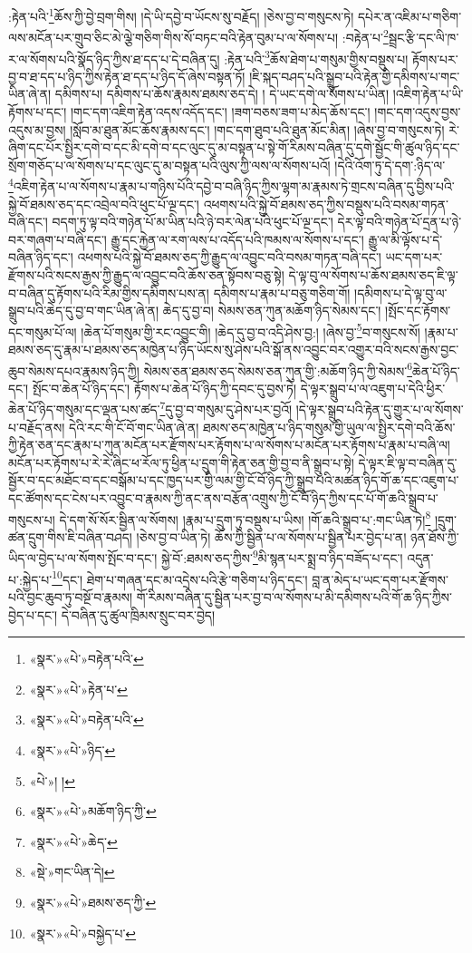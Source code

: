 :རྟེན་པའི་\footnote{«སྣར་»«པེ་»བརྟེན་པའི་}ཆོས་ཀྱི་བྱེ་བྲག་གིས། །དེ་ཡི་དབྱེ་བ་ཡོངས་སུ་བརྗོད། །ཅེས་བྱ་བ་གསུངས་ཏེ། དཔེར་ན་འཇིམ་པ་གཅིག་ལས་མངོན་པར་གྲུབ་ཅིང་མེ་ལྕེ་གཅིག་གིས་སོ་བཏང་བའི་རྟེན་བུམ་པ་ལ་སོགས་པ། :བརྟེན་པ་\footnote{«སྣར་»«པེ་»རྟེན་པ་}སྦྲང་རྩི་དང་ལི་ཁ་ར་ལ་སོགས་པའི་སྣོད་ཉིད་ཀྱིས་ཐ་དད་པ་དེ་བཞིན་དུ། :རྟེན་པའི་\footnote{«སྣར་»«པེ་»བརྟེན་པའི་}ཆོས་ཐེག་པ་གསུམ་གྱིས་བསྡུས་པ། རྟོགས་པར་བྱ་བ་ཐ་དད་པ་ཉིད་ཀྱིས་རྟེན་ཐ་དད་པ་ཉིད་དོ་ཞེས་བསྟན་ཏོ། །ཇི་སྐད་བཤད་པའི་སྒྲུབ་པའི་རྟེན་གྱི་དམིགས་པ་གང་ཡིན་ཞེ་ན། དམིགས་པ། དམིགས་པ་ཆོས་རྣམས་ཐམས་ཅད་དེ། །
དེ་ཡང་དགེ་ལ་སོགས་པ་ཡིན། །འཇིག་རྟེན་པ་ཡི་རྟོགས་པ་དང་། །གང་དག་འཇིག་རྟེན་འདས་འདོད་དང་། །ཟག་བཅས་ཟག་པ་མེད་ཆོས་དང་། །གང་དག་འདུས་བྱས་འདུས་མ་བྱས། །སློབ་མ་ཐུན་མོང་ཆོས་རྣམས་དང་། །གང་དག་ཐུབ་པའི་ཐུན་མོང་མིན། །ཞེས་བྱ་བ་གསུངས་ཏེ། རེ་ཞིག་དང་པོར་སྤྱིར་དགེ་བ་དང་མི་དགེ་བ་དང་ལུང་དུ་མ་བསྟན་པ་སྟེ་གོ་རིམས་བཞིན་དུ་དགེ་སྦྱོང་གི་ཚུལ་ཉིད་དང་སྲོག་གཅོད་པ་ལ་སོགས་པ་དང་ལུང་དུ་མ་བསྟན་པའི་ལུས་ཀྱི་ལས་ལ་སོགས་པའོ། །དེའི་འོག་ཏུ་དེ་དག་:ཉིད་ལ་\footnote{«སྣར་»«པེ་»ཉིད་}འཇིག་རྟེན་པ་ལ་སོགས་པ་རྣམ་པ་གཉིས་པོའི་དབྱེ་བ་བཞི་ཉིད་ཀྱིས་ལྷག་མ་རྣམས་ཏེ་གྲངས་བཞིན་དུ་བྱིས་པའི་སྐྱེ་བོ་ཐམས་ཅད་དང་འབྲེལ་བའི་ཕུང་པོ་ལྔ་དང་། འཕགས་པའི་སྐྱེ་བོ་ཐམས་ཅད་ཀྱིས་བསྡུས་པའི་བསམ་གཏན་བཞི་དང་། བདག་ཏུ་ལྟ་བའི་གཉེན་པོ་མ་ཡིན་པའི་ཉེ་བར་ལེན་པའི་ཕུང་པོ་ལྔ་དང་། དེར་ལྟ་བའི་གཉེན་པོ་དྲན་པ་ཉེ་བར་གཞག་པ་བཞི་དང་། རྒྱུ་དང་རྐྱེན་ལ་རག་ལས་པ་འདོད་པའི་ཁམས་ལ་སོགས་པ་དང་། རྒྱུ་ལ་མི་ལྟོས་པ་དེ་བཞིན་ཉིད་དང་། འཕགས་པའི་སྐྱེ་བོ་ཐམས་ཅད་ཀྱི་རྒྱུད་ལ་འབྱུང་བའི་བསམ་གཏན་བཞི་དང་། ཡང་དག་པར་རྫོགས་པའི་སངས་རྒྱས་ཀྱི་རྒྱུད་ལ་འབྱུང་བའི་ཆོས་ཅན་སྟོབས་བཅུ་སྟེ། དེ་ལྟ་བུ་ལ་སོགས་པ་ཆོས་ཐམས་ཅད་ཇི་ལྟ་བ་བཞིན་དུ་རྟོགས་པའི་རིམ་གྱིས་དམིགས་པས་ན། དམིགས་པ་རྣམ་པ་བཅུ་གཅིག་གོ། །དམིགས་པ་དེ་ལྟ་བུ་ལ་སྒྲུབ་པའི་ཆེད་དུ་བྱ་བ་གང་ཡིན་ཞེ་ན། ཆེད་དུ་བྱ་བ། སེམས་ཅན་ཀུན་མཆོག་ཉིད་སེམས་དང་། །སྤོང་དང་རྟོགས་དང་གསུམ་པོ་ལ། །ཆེན་པོ་གསུམ་གྱི་རང་འབྱུང་གི། །ཆེད་དུ་བྱ་བ་འདི་ཤེས་བྱ:། །ཞེས་བྱ་\footnote{«པེ་»། །}བ་གསུངས་སོ། །རྣམ་པ་ཐམས་ཅད་དུ་རྣམ་པ་ཐམས་ཅད་མཁྱེན་པ་ཉིད་ཡོངས་སུ་ཤེས་པའི་སྒོ་ནས་འབྱུང་བར་འགྱུར་བའི་སངས་རྒྱས་བྱང་ཆུབ་སེམས་དཔའ་རྣམས་ཉིད་ཀྱི། སེམས་ཅན་ཐམས་ཅད་སེམས་ཅན་ཀུན་གྱི་:མཆོག་ཉིད་ཀྱི་སེམས་\footnote{«སྣར་»«པེ་»མཆོག་ཉིད་ཀྱི་}ཆེན་པོ་ཉིད་དང་། སྤོང་བ་ཆེན་པོ་ཉིད་དང་། རྟོགས་པ་ཆེན་པོ་ཉིད་ཀྱི་དབང་དུ་བྱས་ཏེ། དེ་ལྟར་སྒྲུབ་པ་ལ་འཇུག་པ་དེའི་ཕྱིར་ཆེན་པོ་ཉིད་གསུམ་དང་ལྡན་པས་ཚད་\footnote{«སྣར་»«པེ་»ཆེད་}དུ་བྱ་བ་གསུམ་དུ་ཤེས་པར་བྱའོ། །དེ་ལྟར་སྒྲུབ་པའི་རྟེན་དུ་གྱུར་པ་ལ་སོགས་པ་བརྗོད་ནས། དེའི་རང་གི་ངོ་བོ་གང་ཡིན་ཞེ་ན། ཐམས་ཅད་མཁྱེན་པ་ཉིད་གསུམ་གྱི་ཡུལ་ལ་སྤྱིར་དགེ་བའི་ཆོས་ཀྱི་རྟེན་ཅན་དང་རྣམ་པ་ཀུན་མངོན་པར་རྫོགས་པར་རྟོགས་པ་ལ་སོགས་པ་མངོན་པར་རྟོགས་པ་རྣམ་པ་བཞི་ལ། མངོན་པར་རྟོགས་པ་རེ་རེ་ཞིང་ཕ་རོལ་ཏུ་ཕྱིན་པ་དྲུག་གི་རྟེན་ཅན་གྱི་བྱ་བ་ནི་སྒྲུབ་པ་སྟེ། དེ་ལྟར་ཇི་ལྟ་བ་བཞིན་དུ་སྦྱོར་བ་དང་མཐོང་བ་དང་བསྒོམ་པ་དང་ཁྱད་པར་གྱི་ལམ་གྱི་ངོ་བོ་ཉིད་ཀྱི་སྒྲུབ་པའི་མཚན་ཉིད་གོ་ཆ་དང་འཇུག་པ་དང་ཚོགས་དང་ངེས་པར་འབྱུང་བ་རྣམས་ཀྱི་ནང་ནས་བརྩོན་འགྲུས་ཀྱི་ངོ་བོ་ཉིད་ཀྱིས་དང་པོ་གོ་ཆའི་སྒྲུབ་པ་གསུངས་པ། དེ་དག་སོ་སོར་སྦྱིན་ལ་སོགས། །རྣམ་པ་དྲུག་ཏུ་བསྡུས་པ་ཡིས། །གོ་ཆའི་སྒྲུབ་པ་:གང་ཡིན་ཏེ།\footnote{«སྡེ་»གང་ཡིན་དེ།} །དྲུག་ཚན་དྲུག་གིས་ཇི་བཞིན་བཤད། །ཅེས་བྱ་བ་ཡིན་ཏེ། ཆོས་ཀྱི་སྦྱིན་པ་ལ་སོགས་པ་སྦྱིན་པར་བྱེད་པ་ན། ཉན་ཐོས་ཀྱི་ཡིད་ལ་བྱེད་པ་ལ་སོགས་སྤོང་བ་དང་། སྐྱེ་བོ་:ཐམས་ཅད་ཀྱིས་\footnote{«སྣར་»«པེ་»ཐམས་ཅད་ཀྱི་}མི་སྙན་པར་སྨྲ་བ་ཉིད་བཟོད་པ་དང་། འདུན་པ་:སྐྱེད་པ་\footnote{«སྣར་»«པེ་»བསྐྱེད་པ་}དང་། ཐེག་པ་གཞན་དང་མ་འདྲེས་པའི་རྩེ་གཅིག་པ་ཉིད་དང་། བླ་ན་མེད་པ་ཡང་དག་པར་རྫོགས་པའི་བྱང་ཆུབ་ཏུ་བསྔོ་བ་རྣམས། གོ་རིམས་བཞིན་དུ་སྦྱིན་པར་བྱ་བ་ལ་སོགས་པ་མི་དམིགས་པའི་གོ་ཆ་ཉིད་ཀྱིས་བྱེད་པ་དང་། དེ་བཞིན་དུ་ཚུལ་ཁྲིམས་སྲུང་བར་བྱེད། 